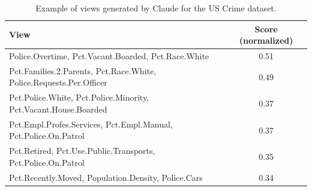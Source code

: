 \begin{table}[t]
  \centering
  \small
  \begin{tabulary}{\columnwidth}{L c}
    \hline
    View & Score (normalized)\\
    \hline
    Police.Overtime, Pct.Vacant.Boarded, Pct.Race.White & 0.51\\
    Pct.Families.2.Parents, Pct.Race.White, Police.Requests.Per.Officer & 0.49\\
    Pct.Police.White, Pct.Police.Minority, Pct.Vacant.House.Boarded& 0.37\\
    Pct.Empl.Profes.Services, Pct.Empl.Manual, Pct.Police.On.Patrol & 0.37\\
    Pct.Retired, Pct.Use.Public.Transports, Pct.Police.On.Patrol& 0.35 \\
    Pct.Recently.Moved, Population.Density, Police.Cars & 0.34 \\
    \hline
\end{tabulary}
    \caption{Example of views generated by Claude for the US Crime dataset.}
    \label{tab:crime_views}
\end{table}

